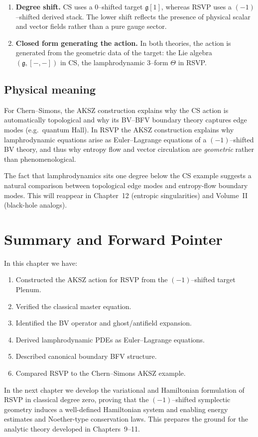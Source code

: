 \begin{enumerate}
\item
{\bf Degree shift.}
CS uses a $0$--shifted target $\mathfrak{g}[1]$, whereas RSVP uses a
$(-1)$--shifted derived stack.
The lower shift reflects the presence of physical scalar
and vector fields rather than a pure gauge sector.

\item
{\bf Closed form generating the action.}
In both theories, the action is generated from the geometric
data of the target:
the Lie algebra $(\mathfrak{g},[-,-])$ in CS,
the lamphrodynamic $3$--form $\Theta$ in RSVP.
\end{enumerate}

\subsection{Physical meaning}
For Chern--Simons, the AKSZ construction explains why the CS action is
automatically topological and why its BV–BFV boundary theory captures
edge modes (e.g.\ quantum Hall).
In RSVP the AKSZ construction explains why lamphrodynamic equations
arise as Euler--Lagrange equations of a $(-1)$--shifted BV theory,
and thus why entropy flow and vector circulation are
\emph{geometric} rather than phenomenological.

\begin{remark}
The fact that lamphrodynamics sits one degree below the CS example
suggests a natural comparison between topological edge modes and
entropy-flow boundary modes. This will reappear in Chapter~12
(entropic singularities) and Volume~II (black-hole analogs).
\end{remark}



\section{Summary and Forward Pointer}
\label{sec:summary-aksz}

In this chapter we have:
\begin{enumerate}
\item Constructed the AKSZ action for RSVP from the
      $(-1)$--shifted target $\mathrm{Plenum}$.
\item Verified the classical master equation.
\item Identified the BV operator and ghost/antifield expansion.
\item Derived lamphrodynamic PDEs as Euler--Lagrange equations.
\item Described canonical boundary BFV structure.
\item Compared RSVP to the Chern--Simons AKSZ example.
\end{enumerate}

In the next chapter we develop the variational and Hamiltonian
formulation of RSVP in classical degree zero, proving that the
$(-1)$--shifted symplectic geometry induces a well-defined Hamiltonian
system and enabling energy estimates and Noether-type conservation
laws. This prepares the ground for the analytic theory developed in
Chapters~9--11.

